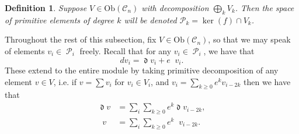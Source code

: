 \documentclass{amsart}
\newtheorem{definition}[theorem]{Definition}
\DeclareMathOperator{\dee}{\mathfrak{d}}
\DeclareMathOperator{\deebar}{\overline{\mathfrak{d}}}
\DeclareMathOperator{\Prim}{\mathcal{P}}
\theoremstyle{definition}
\begin{document}
\begin{definition}
Suppose $V \in \mathrm{Ob}(\mathscr{C}_n)$ with decomposition $\bigoplus_k V_k$. Then the space of primitive elements of degree $k$ will be denoted  $\mathcal{P}_k = \ker(f) \cap V_k$.
\end{definition}
Throughout the rest of this subsection, fix $V \in \mathrm{Ob}(\mathscr{C}_n)$, so that we may speak of elements $v_i \in \Prim_i$ freely. Recall that for any $v_i \in \Prim_i$, we have that
\begin{equation*}
    dv_i = \dee v_i + e\deebar v_i.
\end{equation*}
These extend to the entire module by taking primitive decomposition of any element $v \in V$, i.e. if $v=\sum v_i$ for $v_i \in V_i$, and $v_i= \sum_{k \geq 0}e^k v_{i-2k}$ then we have that
\begin{align*}
    \dee v &= \sum_i\sum_{k \geq 0} e^k \dee v_{i-2k}, \\
     \deebar v &= \sum_i \sum_{k \geq 0} e^k \deebar v_{i-2k}.
\end{align*}
\end{document}
